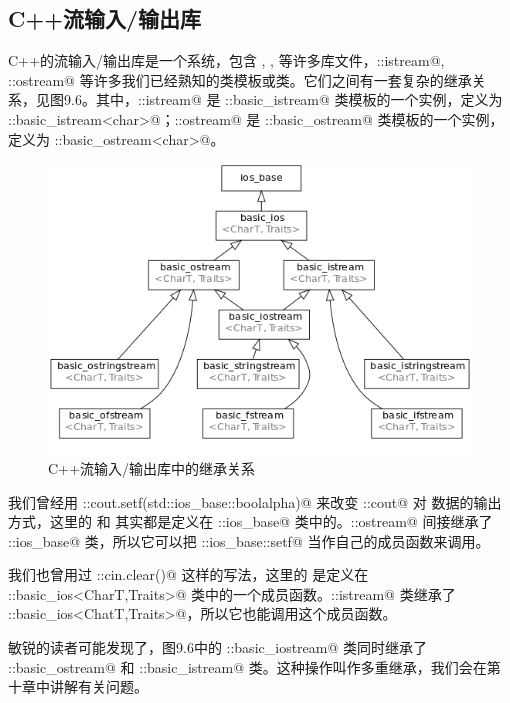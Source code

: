 \subsection*{C++流输入/输出库}
C++的流输入/输出库是一个系统，包含 \lstinline@iostream@, \lstinline@fstream@, \lstinline@sstream@ 等许多库文件，\lstinline@std::istream@, \lstinline@std::ostream@ 等许多我们已经熟知的类模板或类。它们之间有一套复杂的继承关系，见图9.6。其中，\lstinline@std::istream@ 是 \lstinline@std::basic_istream@ 类模板的一个实例，定义为 \lstinline@std::basic_istream<char>@；\lstinline@std::ostream@ 是 \lstinline@std::basic_ostream@ 类模板的一个实例，定义为 \lstinline@std::basic_ostream<char>@。\par
\begin{figure}[htbp]
    \centering
    \includegraphics[width=.8\textwidth]{../images/generalized_parts/09_inheritance_diagram_of_io_library.png}
    \caption{C++流输入/输出库中的继承关系}
\end{figure}
我们曾经用 \lstinline@std::cout.setf(std::ios_base::boolalpha)@ 来改变 \lstinline@std::cout@ 对 \lstinline@bool@ 数据的输出方式，这里的 \lstinline@setf@ 和 \lstinline@fmtflags@ 其实都是定义在 \lstinline@std::ios_base@ 类中的。\lstinline@std::ostream@ 间接继承了 \lstinline@std::ios_base@ 类，所以它可以把 \lstinline@std::ios_base::setf@ 当作自己的成员函数来调用。\par
我们也曾用过 \lstinline@std::cin.clear()@ 这样的写法，这里的 \lstinline@clear@ 是定义在 \lstinline@std::basic_ios<CharT,Traits>@ 类中的一个成员函数。\lstinline@std::istream@ 类继承了 \lstinline@std::basic_ios<ChatT,Traits>@，所以它也能调用这个成员函数。\par
敏锐的读者可能发现了，图9.6中的 \lstinline@std::basic_iostream@ 类同时继承了 \lstinline@std::basic_ostream@ 和 \lstinline@std::basic_istream@ 类。这种操作叫作多重继承，我们会在第十章中讲解有关问题。\par
